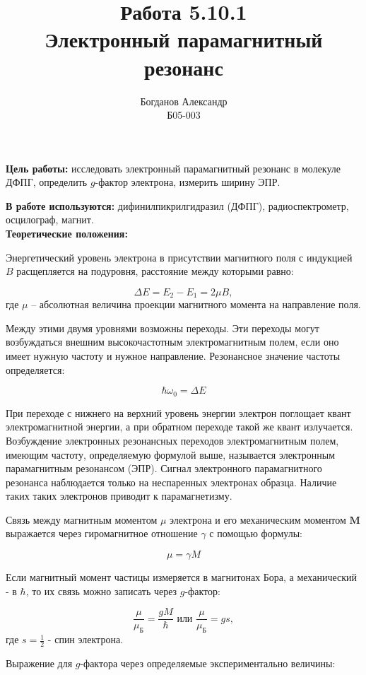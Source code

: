 \documentclass[a4paper, 12pt]{article}%
\author{Богданов Александр \\
	Б05-003}
\title{\textbf{Работа 5.10.1 \\ 
		Электронный парамагнитный резонанс}}
\begin{document}
\maketitle

\textbf{Цель работы:}  исследовать электронный парамагнитный резонанс в молекуле ДФПГ, определить $g$-фактор электрона,  измерить ширину ЭПР.
    
\textbf{В работе используются:} дифинилпикрилгидразил (ДФПГ),  радиоспектрометр,  осцилограф,  магнит.\\

\textbf{Теоретические положения:}\\\par

	Энергетический уровень электрона в присутствии магнитного поля с индукцией $B$ расщепляется на подуровня, расстояние между которыми равно:
		
\[ \Delta E = E_2 - E_1 = 2\mu B,  \]
где $\mu$ -- абсолютная величина проекции магнитного момента на направление поля.
	
	Между этими двумя уровнями возможны переходы.  Эти переходы могут возбуждаться внешним высокочастотным электромагнитным полем,  если оно имеет нужную частоту и нужное направление.  Резонансное значение частоты определяется:
	
\[ \hbar \omega_0 = \Delta E \]

	При переходе с нижнего на верхний уровень энергии электрон поглощает квант электромагнитной энергии,  а при обратном переходе такой же квант излучается. Возбуждение электронных резонансных переходов электромагнитным полем, имеющим частоту, определяемую формулой выше,  называется электронным парамагнитным резонансом (ЭПР).  Сигнал электронного парамагнитного резонанса наблюдается только на неспаренных электронах образца.  Наличие таких таких электронов приводит к парамагнетизму. 
	
	Связь между магнитным моментом $\mu$ электрона и его механическим моментом $\mathbf{M}$ выражается через гиромагнитное отношение $\gamma$ с помощью формулы:

\[ \mu = \gamma M \]
	
	Если магнитный момент частицы измеряется в магнитонах Бора, а механический - в $\hbar$, то их связь можно записать через $g$-фактор:
	
\[ \frac{\mu}{\mu_\text{Б}} = \frac{gM}{\hbar} \text{ или }  \frac{\mu}{\mu_\text{Б}} = gs,  \]
где $s = \frac{1}{2}$ - спин электрона.

	Выражение для $g$-фактора через определяемые экспериментально величины:
	
\end{document}
